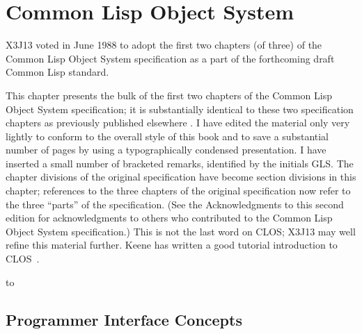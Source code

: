 
\clearpage\def\pagestatus{FINAL PROOF}



\def\CLOS{Common Lisp Object System}
\def\OS{Object System}
\def\bit{\it}                             %
\def\sub{_}

\chapter{Common Lisp Object System}
\label{CLOS}

\prefaceword
\begin{new}
X3J13 voted in June 1988
to adopt the first two chapters (of three) of the
Common Lisp Object System specification
as a part of the forthcoming draft Common Lisp standard.
\end{new}
This chapter presents the bulk of the first two chapters of the
Common Lisp Object System specification; it is substantially
identical to these two specification chapters as previously published elsewhere
\cite{SIGPLAN-CLOS,LASC-CLOS-PART-1,LASC-CLOS-PART-2}.
I have edited the material only very lightly
to conform to the overall style of this book and to save a substantial
number of pages by using a typographically condensed presentation.
I have inserted a small
number of bracketed remarks, identified by the initials GLS.
The chapter divisions of the original specification have become
section divisions in this chapter; references to the three chapters
of the original specification now refer to the three ``parts'' of the
specification.
(See the Acknowledgments to this second edition for
acknowledgments to others who contributed to the Common Lisp Object System specification.)
This is not the last word on CLOS;
X3J13 may well refine this material further.
Keene has written a good tutorial introduction to CLOS~\cite{KEENE}.

\noindent\hbox to \textwidth{\hss---Guy L. Steele Jr.}

\section{Programmer Interface Concepts}

